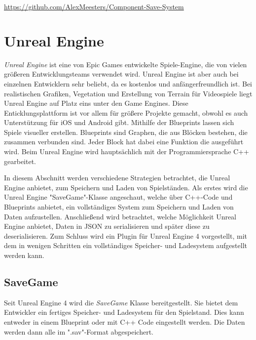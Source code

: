 \url{https://github.com/AlexMeesters/Component-Save-System}


\section{Unreal Engine}
\textit{Unreal Engine} ist eine von Epic Games entwickelte Spiele-Engine, die von vielen größeren Entwicklungsteams verwendet wird. Unreal Engine ist aber auch bei einzelnen Entwicklern sehr beliebt, da es kostenlos und anfängerfreundlich ist. Bei realistischen Grafiken, Vegetation und Erstellung von Terrain für Videospiele liegt Unreal Engine auf Platz eins unter den Game Engines. Diese Enticklungsplattform ist vor allem für größere Projekte gemacht, obwohl es auch Unterstützung für iOS und Android gibt. Mithilfe der Blueprints lassen sich Spiele visueller erstellen. Blueprints sind Graphen, die aus Blöcken bestehen, die zusammen verbunden sind. Jeder Block hat dabei eine Funktion die ausgeführt wird. Beim Unreal Engine wird hauptsächlich mit der Programmiersprache C++ gearbeitet.\cite{vsmid2017comparison}

In diesem Abschnitt werden verschiedene Strategien betrachtet, die Unreal Engine anbietet, zum Speichern und Laden von Spielständen. Als erstes wird die Unreal Engine "SaveGame"-Klasse angeschaut, welche über C++-Code und Blueprints anbietet, ein vollständiges System zum Speichern und Laden von Daten aufzustellen. Anschließend wird betrachtet, welche Möglichkeit Unreal Engine anbietet, Daten in JSON zu serialisieren und später diese zu deserialisieren. Zum Schluss wird ein Plugin für Unreal Engine 4 vorgestellt, mit dem in wenigen Schritten ein vollständiges Speicher- und Ladesystem aufgestellt werden kann. 

\subsection{SaveGame}
Seit Unreal Engine 4 wird die \textit{SaveGame} Klasse bereitgestellt. Sie bietet dem Entwickler ein fertiges Speicher- und Ladesystem für den Spielstand. Dies kann entweder in einem Blueprint oder mit C++ Code eingestellt werden. Die Daten werden dann alle im ".sav"-Format abgespeichert.
\cite{unrealengineSavingLoading}

